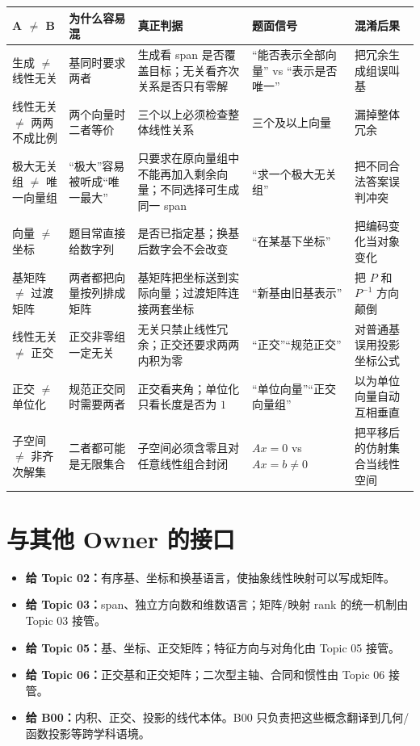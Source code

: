 \documentclass[11pt,a4paper]{ctexart}
\newcommand{\kw}[1]{\textbf{\color{deep}#1}}
\begin{document}
\small
\begin{longtable}{L{3.15cm}L{3.15cm}L{3.65cm}L{3.15cm}L{2.7cm}}
\toprule
\textbf{A $\neq$ B} & \textbf{为什么容易混} & \textbf{真正判据} & \textbf{题面信号} & \textbf{混淆后果}\\
\midrule
生成 $\neq$ 线性无关 & 基同时要求两者 & 生成看 span 是否覆盖目标；无关看齐次关系是否只有零解 & “能否表示全部向量” vs “表示是否唯一” & 把冗余生成组误叫基\\
线性无关 $\neq$ 两两不成比例 & 两个向量时二者等价 & 三个以上必须检查整体线性关系 & 三个及以上向量 & 漏掉整体冗余\\
极大无关组 $\neq$ 唯一向量组 & “极大”容易被听成“唯一最大” & 只要求在原向量组中不能再加入剩余向量；不同选择可生成同一 span & “求一个极大无关组” & 把不同合法答案误判冲突\\
向量 $\neq$ 坐标 & 题目常直接给数字列 & 是否已指定基；换基后数字会不会改变 & “在某基下坐标” & 把编码变化当对象变化\\
基矩阵 $\neq$ 过渡矩阵 & 两者都把向量按列排成矩阵 & 基矩阵把坐标送到实际向量；过渡矩阵连接两套坐标 & “新基由旧基表示” & 把 $P$ 和 $P^{-1}$ 方向颠倒\\
线性无关 $\neq$ 正交 & 正交非零组一定无关 & 无关只禁止线性冗余；正交还要求两两内积为零 & “正交”“规范正交” & 对普通基误用投影坐标公式\\
正交 $\neq$ 单位化 & 规范正交同时需要两者 & 正交看夹角；单位化只看长度是否为 $1$ & “单位向量”“正交向量组” & 以为单位向量自动互相垂直\\
子空间 $\neq$ 非齐次解集 & 二者都可能是无限集合 & 子空间必须含零且对任意线性组合封闭 & $Ax=0$ vs $Ax=b\neq0$ & 把平移后的仿射集合当线性空间\\
\bottomrule
\end{longtable}
\normalsize

\section{与其他 Owner 的接口}

\begin{itemize}
  \item \kw{给 Topic 02：}有序基、坐标和换基语言，使抽象线性映射可以写成矩阵。
  \item \kw{给 Topic 03：}span、独立方向数和维数语言；矩阵/映射 rank 的统一机制由 Topic 03 接管。
  \item \kw{给 Topic 05：}基、坐标、正交矩阵；特征方向与对角化由 Topic 05 接管。
  \item \kw{给 Topic 06：}正交基和正交矩阵；二次型主轴、合同和惯性由 Topic 06 接管。
  \item \kw{给 B00：}内积、正交、投影的线代本体。B00 只负责把这些概念翻译到几何/函数投影等跨学科语境。
\end{itemize}
\end{document}
